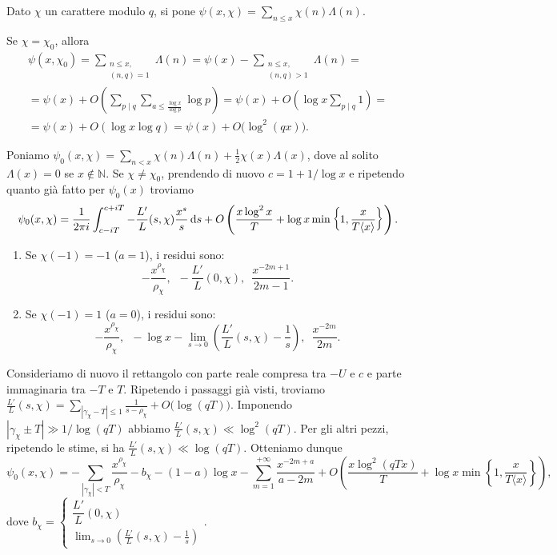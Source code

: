 \begin{defn}
  Dato $\chi$ un carattere modulo $q$, si pone $\displaystyle \psi(x,\chi)=\sum_{n \le x} \chi(n)\Lambda(n)$.
\end{defn}

\begin{oss}
  Se $\chi=\chi_0$, allora
  \begin{gather*}
    \psi(x,\chi_0)=\sum_{\substack{n \le x,\\ (n,q)=1}} \Lambda(n)=\psi(x)-\sum_{\substack{n \le x,\\ (n,q)>1}} \Lambda(n)= \\
    =\psi(x)+O\left(\sum_{p \mid q} \sum_{a \le \frac{\log{x}}{\log{p}}}\log{p}\right)=\psi(x)+O\left(\log{x}\sum_{p \mid q} 1\right)= \\
    =\psi(x)+O(\log{x}\log{q})=\psi(x)+O\big(\log^2(qx)\big).
  \end{gather*}
\end{oss}

Poniamo $\displaystyle \psi_0(x,\chi)=\sum_{n<x} \chi(n)\Lambda(n)+\frac{1}{2}\chi(x)\Lambda(x)$, dove al solito $\Lambda(x)=0$ se $x \not\in \mathbb{N}$. Se $\chi\not=\chi_0$, prendendo di nuovo $c=1+1/\log{x}$ e ripetendo quanto già fatto per $\psi_0(x)$ troviamo
$$\psi_0(x,\chi)=\frac{1}{2\pi i} \int_{c-iT}^{c+iT} -\frac{L'}{L}(s,\chi)\frac{x^s}{s}\mathop{}\!\mathrm{d} s+O\left(\frac{x\log^2{x}}{T}+\log{x}\min\left\{1,\frac{x}{T\langle x\rangle}\right\}\right).$$

\begin{enumerate}
  \item Se $\chi(-1)=-1$ ($a=1$), i residui sono:
  $$-\frac{x^{\rho_\chi}}{\rho_\chi}, \,\,\, -\frac{L'}{L}(0,\chi), \,\,\, \frac{x^{-2m+1}}{2m-1}.$$
  \item Se $\chi(-1)=1$ ($a=0$), i residui sono:
  $$-\frac{x^{\rho_\chi}}{\rho_\chi}, \,\,\, -\log{x}-\lim_{s \longrightarrow 0} \left(\frac{L'}{L}(s,\chi)-\frac{1}{s}\right), \,\,\, \frac{x^{-2m}}{2m}.$$
\end{enumerate}

Consideriamo di nuovo il rettangolo con parte reale compresa tra $-U$ e $c$ e parte immaginaria tra $-T$ e $T$. Ripetendo i passaggi già visti, troviamo $\displaystyle \frac{L'}{L}(s,\chi)=\sum_{|\gamma_\chi-T| \le 1} \frac{1}{s-\rho_\chi}+O\big(\log(qT)\big)$. Imponendo $|\gamma_\chi\pm T| \gg 1/\log(qT)$ abbiamo $\frac{L'}{L}(s,\chi) \ll \log^2(qT)$.
Per gli altri pezzi, ripetendo le stime, si ha $\frac{L'}{L}(s,\chi) \ll \log(qT)$. Otteniamo dunque
$$\psi_0(x,\chi)=-\sum_{|\gamma_\chi|<T} \frac{x^{\rho_\chi}}{\rho_\chi}-b_\chi-(1-a)\log{x}-\sum_{m=1}^{+\infty} \frac{x^{-2m+a}}{a-2m}+O\left(\frac{x\log^2(qTx)}{T}+\log{x}\min\left\{1,\frac{x}{T\langle x\rangle}\right\}\right),$$
dove $b_\chi=\begin{cases}
  \dfrac{L'}{L}(0,\chi) \\ \displaystyle\lim_{s \longrightarrow 0} \left(\frac{L'}{L}(s,\chi)-\frac{1}{s}\right)
\end{cases}$.

